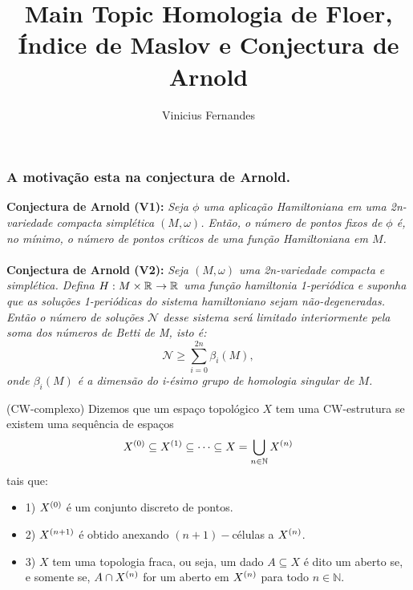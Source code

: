 \documentclass{beamer}
\title[Short title]{Main Topic } %
\author{Vinicius Fernandes}
\title{Homologia de Floer, Índice de Maslov e Conjectura de Arnold}
\institute{Universidade Federal do ABC}
\begin{document}
	
	\begin{frame}
		\titlepage %
	\end{frame}
	
	\begin{frame}
		\frametitle{
			A motivação esta na conjectura de Arnold.}
		\textbf{Conjectura de Arnold (V1):} \textit{Seja $\phi$ uma aplicação Hamiltoniana em uma 2n-variedade compacta simplética $(M, \omega)$. Então, o número de pontos fixos de $\phi$ é, no mínimo, o número de pontos críticos de uma função Hamiltoniana em $M$.}
		\\~\\
		
		\pause	
		\textbf{Conjectura de Arnold (V2):} \textit	{Seja $(M,\omega)$ uma 2n-variedade compacta e simplética. Defina  $H:M\times \mathbb{R}^{} \to \mathbb{R}^{}$  uma função hamiltonia 1-periódica e suponha que as soluções 1-periódicas do sistema hamiltoniano sejam não-degeneradas. Então o número de soluções $\mathcal{N}$ desse sistema será limitado interiormente pela soma dos números de Betti de M, isto é:
			$$
			\mathcal{N}\geq \sum_{i=0}^{2n}\beta_{i}(M),
			$$
			onde $\beta_{i}(M)$ é a dimensão do i-ésimo grupo de homologia singular de $M$.}
	\end{frame}
	
	\begin{frame}
		
		\begin{definicao}
			(CW-complexo) Dizemos que um espaço topológico $X$ tem uma CW-estrutura se existem uma sequência de espaços
			$$
			X^{(0)} \subseteq X^{(1)} \subseteq \dots \subseteq X = \bigcup \limits_{n\in \mathbb{N}} X^{(n)}
			$$ 
			tais que:
			\begin{itemize}
				\item 1) $X^{(0)}$ é um conjunto discreto de pontos.
				
				\item 2) $X^{(n+1)}$ é obtido anexando $(n+1)-$células a $X^{(n)}$.
				
				\item 3) $X$ tem uma topologia fraca, ou seja, um dado $A \subseteq X$ é dito um aberto se, e somente se, $A \cap X^{(n)}$ for um aberto em $X^{(n)}$ para todo $n \in \mathbb{N}$.
			\end{itemize}
		\end{definicao}
	\end{frame}
	
\end{document}
